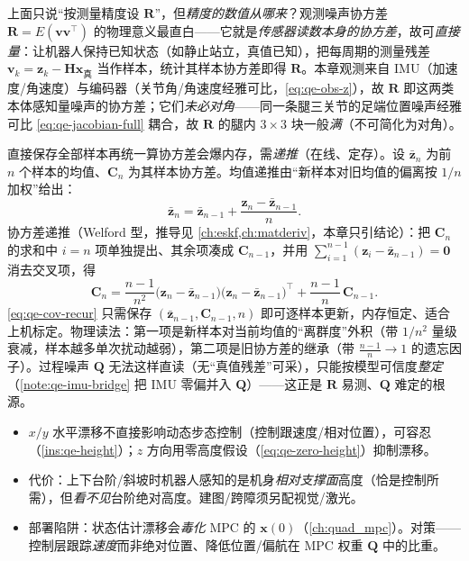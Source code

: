 \begin{derivation}\label{deriv:qe-cov-meas}
上面只说“按测量精度设 $\mathbf{R}$”，但\emph{精度的数值从哪来}？观测噪声协方差 $\mathbf{R}=E(\boldsymbol v\boldsymbol v^\top)$ 的物理意义最直白——它就是\emph{传感器读数本身的协方差}，故可\emph{直接量}：让机器人保持已知状态（如静止站立，真值已知），把每周期的测量残差 $\boldsymbol v_k=\boldsymbol z_k-\mathbf{H}\boldsymbol x_{\text{真}}$ 当作样本，统计其样本协方差即得 $\mathbf{R}$。本章观测来自 IMU（加速度/角速度）与编码器（关节角/角速度经雅可比，\cref{eq:qe-obs-z}），故 $\mathbf{R}$ 即这两类本体感知量噪声的协方差；它们\emph{未必对角}——同一条腿三关节的足端位置噪声经雅可比 \cref{eq:qe-jacobian-full} 耦合，故 $\mathbf{R}$ 的腿内 $3\times3$ 块一般\emph{满}（不可简化为对角）。

直接保存全部样本再统一算协方差会爆内存，需\emph{递推}（在线、定存）。设 $\bar{\boldsymbol z}_n$ 为前 $n$ 个样本的均值、$\mathbf{C}_n$ 为其样本协方差。均值递推由“新样本对旧均值的偏离按 $1/n$ 加权”给出：
\begin{equation}
  \bar{\boldsymbol z}_n = \bar{\boldsymbol z}_{n-1} + \frac{\boldsymbol z_n-\bar{\boldsymbol z}_{n-1}}{n}.
  \label{eq:qe-mean-recur}
\end{equation}
协方差递推（Welford 型，推导见 \cref{ch:eskf,ch:matderiv}，本章只引结论）：把 $\mathbf{C}_n$ 的求和中 $i{=}n$ 项单独提出、其余项凑成 $\mathbf{C}_{n-1}$，并用 $\sum_{i=1}^{n-1}(\boldsymbol z_i-\bar{\boldsymbol z}_{n-1})=\boldsymbol 0$ 消去交叉项，得
\begin{equation}
  \boxed{\;\mathbf{C}_n = \frac{n-1}{n^2}\big(\boldsymbol z_n-\bar{\boldsymbol z}_{n-1}\big)\big(\boldsymbol z_n-\bar{\boldsymbol z}_{n-1}\big)^\top + \frac{n-1}{n}\,\mathbf{C}_{n-1}.\;}
  \label{eq:qe-cov-recur}
\end{equation}
\cref{eq:qe-cov-recur} 只需保存 $(\bar{\boldsymbol z}_{n-1},\mathbf{C}_{n-1},n)$ 即可逐样本更新，内存恒定、适合上机标定。物理读法：第一项是新样本对当前均值的“离群度”外积（带 $1/n^2$ 量级衰减，样本越多单次扰动越弱），第二项是旧协方差的继承（带 $\tfrac{n-1}{n}\!\to\!1$ 的遗忘因子）。过程噪声 $\mathbf{Q}$ 无法这样直读（无“真值残差”可采），只能按模型可信度\emph{整定}（\cref{note:qe-imu-bridge} 把 IMU 零偏并入 $\mathbf{Q}$）——这正是 $\mathbf{R}$ 易测、$\mathbf{Q}$ 难定的根源。
\end{derivation}

\begin{practice}[高度漂移与零高度假设的部署代价]
\begin{itemize}
  \item $x/y$ 水平漂移不直接影响动态步态控制（控制跟速度/相对位置），可容忍（\cref{ins:qe-height}）；$z$ 方向用零高度假设（\cref{eq:qe-zero-height}）抑制漂移。
  \item 代价：上下台阶/斜坡时机器人感知的是机身\emph{相对支撑面}高度（恰是控制所需），但\emph{看不见}台阶绝对高度。建图/跨障须另配视觉/激光。
  \item 部署陷阱：状态估计漂移会\emph{毒化} MPC 的 $\boldsymbol x(0)$（\cref{ch:quad_mpc}）。对策——控制层跟踪\emph{速度}而非绝对位置、降低位置/偏航在 MPC 权重 $\mathbf{Q}$ 中的比重。
\end{itemize}
\end{practice}

